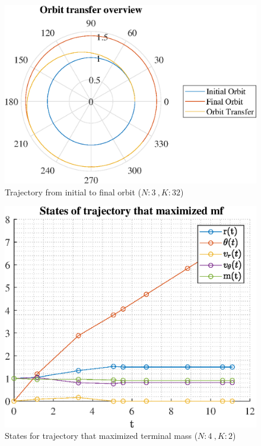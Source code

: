\documentclass[]{article}
\begin{document}
	\begin{figure}
		\centering
		\includegraphics[scale=0.75]{orbit_N3_K32_C3_mf.eps}
		\caption{Trajectory from initial to final orbit (\(N:3\ , K:32\))}
		\label{fig:orbit_N3_K32_C3_mf}
	\end{figure}
	\begin{figure}
		\centering
		\includegraphics[scale=0.75]{states_N4_K2_C3_mf.eps}
		\caption{States for trajectory that maximized terminal mass (\(N:4\ , K:2\))}
		\label{fig:states_N4_K2_C3_mf}
	\end{figure}
\end{document}
